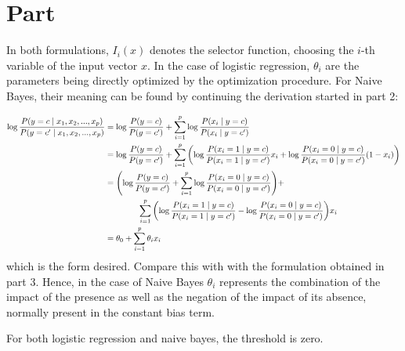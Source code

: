 \documentclass{article}
\newcommand{\enterproblemHeader}[1]{
}
\newcommand{\exitproblemHeader}[1]{
}
\newcounter{problem} %
\newcommand{\problemName}{}
\newenvironment{problem}[1][Part \theproblem]{ %
	\stepcounter{problem} %
	\renewcommand{\problemName}{#1} %
	\section{\problemName} %
	\enterproblemHeader{\problemName} %
}{
	\exitproblemHeader{\problemName} %
}
\begin{document}
\FloatBarrier
\begin{problem}
	
	In both formulations, \(I_i(x)\) denotes the selector function, choosing the \(i\)-th variable of the input vector \(x\). In the case of logistic regression, \(\theta_i\) are the parameters being directly optimized by the optimization procedure. For Naive Bayes, their meaning can be found by continuing the derivation started in part 2:
	
	\begin{align*}
		\log \frac{P(y = c \mid x_1, x_2, ..., x_p)}{P(y = c' \mid x_1, x_2, ..., x_p)} &= \log \frac{P(y = c)}{P(y = c')} + \sum_{i=1}^{p} \log \frac{P(x_i \mid y = c)}{P(x_i \mid y = c')} \\
		&= \log \frac{P(y = c)}{P(y = c')} + \sum_{i=1}^{p}\qty(\log \frac{P(x_i = 1 \mid y = c)}{P(x_i = 1 \mid y = c')}x_i + \log \frac{P(x_i = 0 \mid y = c)}{P(x_i = 0 \mid y = c')}(1 - x_i)) \\
		&= \qty(\log \frac{P(y = c)}{P(y = c')} + \sum_{i=1}^{p} \log \frac{P(x_i = 0 \mid y = c)}{P(x_i = 0 \mid y = c')}) + \\
		&\qquad\qquad \sum_{i=1}^{p}\qty(\log \frac{P(x_i = 1 \mid y = c)}{P(x_i = 1 \mid y = c')} - \log \frac{P(x_i = 0 \mid y = c)}{P(x_i = 0 \mid y = c')})x_i \\
		&= \theta_0 + \sum_{i=1}^{p} \theta_i x_i
	\end{align*}
	which is the form desired. Compare this with with the formulation obtained in part 3. Hence, in the case of Naive Bayes \(\theta_i\) represents the combination of the impact of the presence as well as the negation of the impact of its absence, normally present in the constant bias term. 
	
	For both logistic regression and naive bayes, the threshold is zero.
	
\end{problem}
\clearpage

\end{document}

